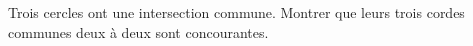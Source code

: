 Trois cercles ont une intersection commune. Montrer que leurs trois cordes communes deux à deux sont concourantes.
